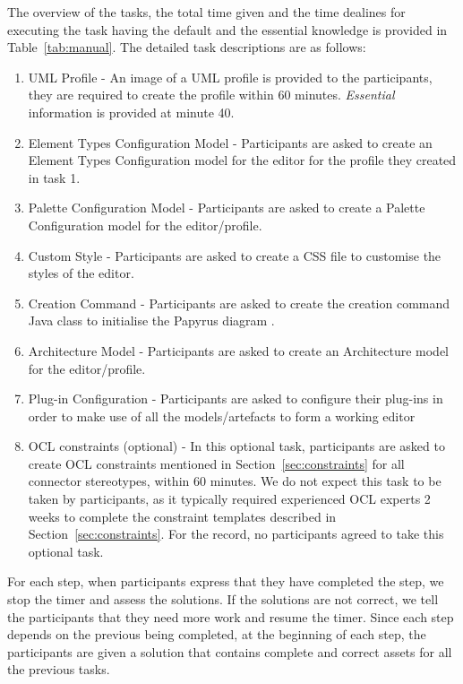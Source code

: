 The overview of the tasks, the total time given and the time dealines for executing the task having the default and the essential knowledge is provided in Table~\ref{tab:manual}. The detailed task descriptions are as follows:
\begin{enumerate}
	\item UML Profile - An image of a UML profile is provided to the participants, they are required to create the profile within 60 minutes.
	\textit{Essential} information is provided at minute 40.
	\item Element Types Configuration Model - Participants are asked to create an Element Types Configuration model for the editor for the profile they created in task 1.
	\item Palette Configuration Model - Participants are asked to create a Palette Configuration model for the editor/profile.
	\item Custom Style - Participants are asked to create a CSS file to customise the styles of the editor.
	\item Creation Command - Participants are asked to create the creation command Java class to initialise the Papyrus diagram .
	\item Architecture Model - Participants are asked to create an Architecture model for the editor/profile.
	\item Plug-in Configuration - Participants are asked to configure their plug-ins in order to make use of all the models/artefacts to form a working editor
	\item OCL constraints (optional) - In this optional task, participants are asked to create OCL constraints mentioned in Section~\ref{sec:constraints} for all connector stereotypes, within 60 minutes. 
	We do not expect this task to be taken by participants, as it typically required experienced OCL experts 2 weeks to complete the constraint templates described in Section~\ref{sec:constraints}.
	For the record, no participants agreed to take this optional task.
\end{enumerate}

For each step, when participants express that they have completed the step, we stop the timer and assess the solutions. 
If the solutions are not correct, we tell the participants that they need more work and resume the timer.
Since each step depends on the previous being completed, at the beginning of each step, the participants are given a solution that contains complete and correct assets for all the previous tasks.

